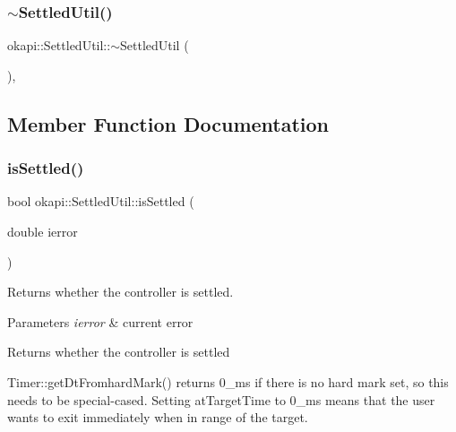\subsubsection{\texorpdfstring{$\sim$SettledUtil()}{~SettledUtil()}}
{\footnotesize\ttfamily okapi\+::\+Settled\+Util\+::$\sim$\+Settled\+Util (\begin{DoxyParamCaption}{ }\end{DoxyParamCaption})\hspace{0.3cm}{\ttfamily [virtual]}, {\ttfamily [default]}}



\subsection{Member Function Documentation}
\mbox{\label{classokapi_1_1SettledUtil_aa651d2e0197b73f568993b4cf2520ca5}} 
\subsubsection{\texorpdfstring{isSettled()}{isSettled()}}
{\footnotesize\ttfamily bool okapi\+::\+Settled\+Util\+::is\+Settled (\begin{DoxyParamCaption}\item[{double}]{ierror }\end{DoxyParamCaption})\hspace{0.3cm}{\ttfamily [virtual]}}

Returns whether the controller is settled.


\begin{DoxyParams}{Parameters}
{\em ierror} & current error \\
\hline
\end{DoxyParams}
\begin{DoxyReturn}{Returns}
whether the controller is settled 
\end{DoxyReturn}
Timer\+::get\+Dt\+Fromhard\+Mark() returns 0\+\_\+ms if there is no hard mark set, so this needs to be special-\/cased. Setting at\+Target\+Time to 0\+\_\+ms means that the user wants to exit immediately when in range of the target.\mbox{\label{classokapi_1_1SettledUtil_a5341b7db25eaff4acafbe59b1b385ada}} 
